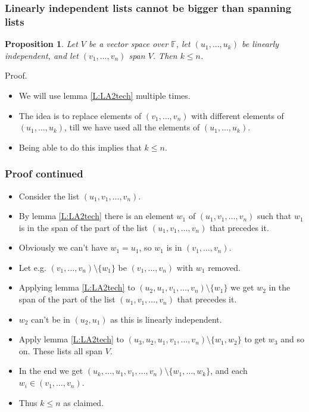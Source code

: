 \documentclass[handout]{beamer}
\newtheorem{proposition}[theorem]{Proposition}
\newcommand{\bF}{\mathbb{F}}
\begin{document}
\begin{frame}
\frametitle{Linearly independent lists cannot be bigger than spanning lists}
\begin{proposition}\label{P:LA2length}
Let $V$ be a vector space over $\bF$, let $(u_1,\ldots,u_k)$ be linearly independent, and let $(v_1,\ldots,v_n)$ span $V$. Then $k\leq n$. 
\end{proposition}
\vspace{0.5cm}
Proof.
\begin{itemize}
\item We will use lemma \ref{L:LA2tech} multiple times.
\vspace{0.5cm}
\item The idea is to replace elements of $(v_1,\ldots,v_n)$ with different elements of $(u_1,\ldots,u_k)$, till we have used all the elements of $(u_1,\ldots,u_k)$.
\vspace{0.5cm}
\item Being able to do this implies that $k\leq n$.
\end{itemize}
\end{frame}

\begin{frame}
\frametitle{Proof continued}
\begin{itemize}
\item Consider the list $(u_1,v_1,\ldots,v_n)$.
\item By lemma \ref{L:LA2tech} there is an element $w_1$ of $(u_1,v_1,\ldots,v_n)$ such that $w_1$ is in the span of the part of the list $(u_1,v_1,\ldots,v_n)$ that precedes it.
\item Obviously we can't have $w_1 = u_1$, so $w_1$ is in $(v_1,\ldots,v_n)$.
\item Let e.g. $(v_1,\ldots,v_n)\setminus \{w_1\}$ be $(v_1,\ldots,v_n)$ with $w_1$ removed.
\item Applying lemma \ref{L:LA2tech} to $(u_2,u_1,v_1,\ldots,v_n)\setminus\{w_1\}$ we get $w_2$ in the span of the part of the list $(u_1,v_1,\ldots,v_n)$ that precedes it.
\item $w_2$ can't be in $(u_2,u_1)$ as this is linearly independent.
\item Apply lemma \ref{L:LA2tech} to $(u_3,u_2,u_1,v_1,\ldots,v_n)\setminus\{w_1,w_2\}$ to get $w_3$ and so on. These lists all span $V$.
\item In the end we get $(u_k,\ldots,u_1,v_1,\ldots,v_n)\setminus\{w_1,\ldots,w_k\}$, and each $w_i\in (v_1,\ldots,v_n)$.
\item Thus $k\leq n$ as claimed.
\end{itemize}
\end{frame}
\end{document}
